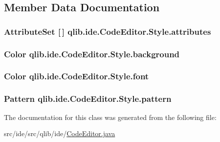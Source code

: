 \subsection{Member Data Documentation}
\subsubsection[{\texorpdfstring{attributes}{attributes}}]{\setlength{\rightskip}{0pt plus 5cm}Attribute\+Set \mbox{[}$\,$\mbox{]} qlib.\+ide.\+Code\+Editor.\+Style.\+attributes}\hypertarget{classqlib_1_1ide_1_1CodeEditor_1_1Style_a1798d9186d961170807fe95eead1029d}{}\label{classqlib_1_1ide_1_1CodeEditor_1_1Style_a1798d9186d961170807fe95eead1029d}
\subsubsection[{\texorpdfstring{background}{background}}]{\setlength{\rightskip}{0pt plus 5cm}Color qlib.\+ide.\+Code\+Editor.\+Style.\+background}\hypertarget{classqlib_1_1ide_1_1CodeEditor_1_1Style_aa185f06a718f6fffe30637733484a7b8}{}\label{classqlib_1_1ide_1_1CodeEditor_1_1Style_aa185f06a718f6fffe30637733484a7b8}
\subsubsection[{\texorpdfstring{font}{font}}]{\setlength{\rightskip}{0pt plus 5cm}Color qlib.\+ide.\+Code\+Editor.\+Style.\+font}\hypertarget{classqlib_1_1ide_1_1CodeEditor_1_1Style_aa248ffd9223379e30577632842250041}{}\label{classqlib_1_1ide_1_1CodeEditor_1_1Style_aa248ffd9223379e30577632842250041}
\subsubsection[{\texorpdfstring{pattern}{pattern}}]{\setlength{\rightskip}{0pt plus 5cm}Pattern qlib.\+ide.\+Code\+Editor.\+Style.\+pattern}\hypertarget{classqlib_1_1ide_1_1CodeEditor_1_1Style_a98a1d4a5736741de2806f55f6aa55f1b}{}\label{classqlib_1_1ide_1_1CodeEditor_1_1Style_a98a1d4a5736741de2806f55f6aa55f1b}


The documentation for this class was generated from the following file\+:\begin{DoxyCompactItemize}
\item 
src/ide/src/qlib/ide/\hyperlink{CodeEditor_8java}{Code\+Editor.\+java}\end{DoxyCompactItemize}
